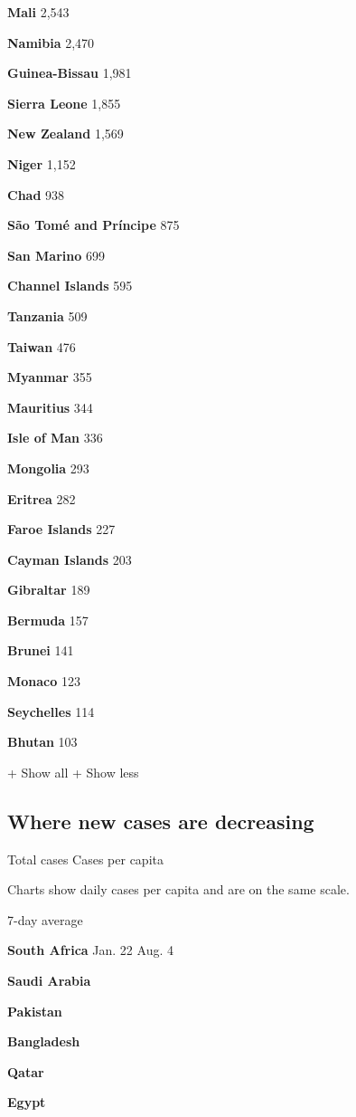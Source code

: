 \textbf{Mali} 2,543

\textbf{Namibia} 2,470

\textbf{Guinea-Bissau} 1,981

\textbf{Sierra Leone} 1,855

\textbf{New Zealand} 1,569

\textbf{Niger} 1,152

\textbf{Chad} 938

\textbf{São Tomé and Príncipe} 875

\textbf{San Marino} 699

\textbf{Channel Islands} 595

\textbf{Tanzania} 509

\textbf{Taiwan} 476

\textbf{Myanmar} 355

\textbf{Mauritius} 344

\textbf{Isle of Man} 336

\textbf{Mongolia} 293

\textbf{Eritrea} 282

\textbf{Faroe Islands} 227

\textbf{Cayman Islands} 203

\textbf{Gibraltar} 189

\textbf{Bermuda} 157

\textbf{Brunei} 141

\textbf{Monaco} 123

\textbf{Seychelles} 114

\textbf{Bhutan} 103

+ Show all + Show less

\hypertarget{where-new-cases-are-decreasing}{%
\subsection{Where new cases are
decreasing}\label{where-new-cases-are-decreasing}}

Total cases Cases per capita

Charts show daily cases per capita and are on the same scale.

7-day average

\textbf{South Africa} Jan. 22 Aug. 4

\textbf{Saudi Arabia}

\textbf{Pakistan}

\textbf{Bangladesh}

\textbf{Qatar}

\textbf{Egypt}

